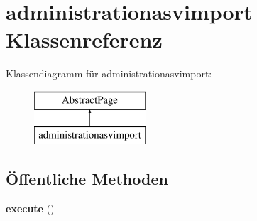 \hypertarget{classadministrationasvimport}{}\section{administrationasvimport Klassenreferenz}
\label{classadministrationasvimport}
Klassendiagramm für administrationasvimport\+:\begin{figure}[H]
\begin{center}
\leavevmode
\includegraphics[height=2.000000cm]{classadministrationasvimport}
\end{center}
\end{figure}
\subsection*{Öffentliche Methoden}
\begin{DoxyCompactItemize}
\item 
\mbox{\label{classadministrationasvimport_a7a6ec3018f2e65b6192b8baa5b85464e}} 
{\bfseries execute} ()
\end{DoxyCompactItemize}
